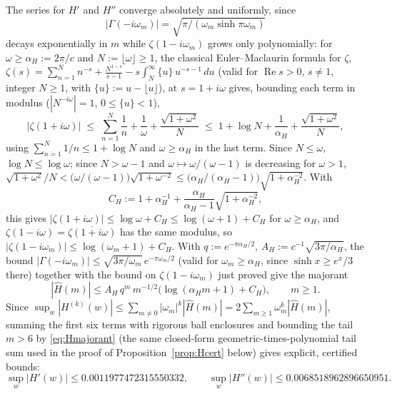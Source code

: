 \documentclass[11pt]{amsart}
\theoremstyle{plain}
\theoremstyle{definition}
\theoremstyle{remark}
\begin{document}
The series for $H'$ and $H''$ converge absolutely and uniformly, since
\[
|\Gamma(-i\omega_m)| = \sqrt{\pi/(\omega_m \sinh \pi\omega_m)}
\]
decays exponentially in $m$ while $\zeta(1-i\omega_m)$ grows only polynomially: for $\omega\ge
\alpha_H := 2\pi/c$ and $N:=\lfloor\omega\rfloor\ge1$, the classical Euler--Maclaurin formula for
$\zeta$, $\zeta(s) = \sum_{n=1}^N n^{-s} + \frac{N^{1-s}}{s-1} - s\int_N^\infty\{u\}\,u^{-s-1}\,du$
(valid for $\operatorname{Re}s>0$, $s\ne1$, integer $N\ge1$, with $\{u\}:=u-\lfloor u\rfloor$), at
$s=1+i\omega$ gives, bounding each term in modulus ($|N^{-i\omega}|=1$, $0\le\{u\}<1$),
\[
|\zeta(1+i\omega)| \;\le\; \sum_{n=1}^N\frac1n + \frac1\omega + \frac{\sqrt{1+\omega^2}}{N}
\;\le\; 1+\log N + \frac1{\alpha_H} + \frac{\sqrt{1+\omega^2}}N,
\]
using $\sum_{n=1}^N 1/n\le1+\log N$ and $\omega\ge\alpha_H$ in the last term. Since $N\le\omega$,
$\log N\le\log\omega$; since $N>\omega-1$ and $\omega\mapsto\omega/(\omega-1)$ is decreasing for
$\omega>1$, $\sqrt{1+\omega^2}/N < \bigl(\omega/(\omega-1)\bigr)\sqrt{1+\omega^{-2}} \le
\bigl(\alpha_H/(\alpha_H-1)\bigr)\sqrt{1+\alpha_H^{-2}}$. With
\[
C_H := 1+\alpha_H^{-1}+\frac{\alpha_H}{\alpha_H-1}\sqrt{1+\alpha_H^{-2}},
\]
this gives $|\zeta(1+i\omega)|\le\log\omega+C_H\le\log(\omega+1)+C_H$ for $\omega\ge\alpha_H$, and
$\zeta(1-i\omega)=\overline{\zeta(1+i\omega)}$ has the same modulus, so
$|\zeta(1-i\omega_m)|\le\log(\omega_m+1)+C_H$. With $q := e^{-\pi\alpha_H/2}$, $A_H :=
c^{-1}\sqrt{3\pi/\alpha_H}$, the bound $|\Gamma(-i\omega_m)|\le\sqrt{3\pi/\omega_m}\,e^{-\pi\omega_m/2}$
(valid for $\omega_m\ge\alpha_H$, since $\sinh x\ge e^x/3$ there) together with the bound on
$\zeta(1-i\omega_m)$ just proved give the majorant
\begin{equation}
\label{eq:Hmajorant}
|\hat H(m)| \le A_H\,q^m\,m^{-1/2}\bigl(\log(\alpha_H m+1)+C_H\bigr), \qquad m\ge1.
\end{equation}
Since $\sup_w|H^{(k)}(w)| \le \sum_{m\ne0}|\omega_m|^k|\hat H(m)| = 2\sum_{m\ge1}\omega_m^k|\hat
H(m)|$, summing the first six terms with rigorous ball enclosures and bounding the tail $m>6$ by
\eqref{eq:Hmajorant}
(the same closed-form geometric-times-polynomial tail sum used in the proof of
Proposition~\ref{prop:Hcert} below) gives explicit, certified bounds:
\begin{equation}
\label{eq:Hbounds}
\sup_w |H'(w)| \le 0.0011977472315550332, \qquad \sup_w |H''(w)| \le 0.0068518962896650951.
\end{equation}
\end{document}
